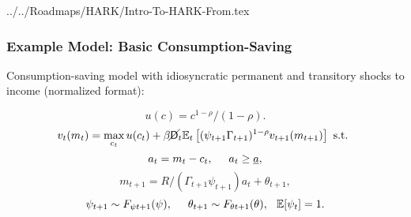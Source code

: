 \documentclass[11ptt]{beamer}
\newcommand{\E}{\mathbb{E}}
\newcommand{\ei}{\end{itemize}}
\newcommand{\Die}{\mathsf{D}}
\newcommand{\Live}{\cancel{\Die}}
\begin{document}
\begin{verbatimwrite}{../../Roadmaps/HARK/Intro-To-HARK-From.tex}


\end{verbatimwrite}


\begin{frame}\label{ModelMath}
\frametitle{Example Model: Basic Consumption-Saving}

Consumption-saving model with idiosyncratic permanent and transitory shocks to income (normalized format):

\begin{equation*}
u(c) = c^{1-\rho}/(1-\rho).
\end{equation*}
\begin{equation*}
v_t(m_t) = \max_{c_t} u(c_t) + \beta \Live_t \E_t \left[(\psi_{t+1} \Gamma_{t+1})^{1-\rho} v_{t+1}(m_{t+1}) \right] \text{ s.t. }
\end{equation*}
\begin{equation*}
a_t = m_t - c_t, \hspace{0.5cm} a_t \geq \underline{a},
\end{equation*}
\begin{equation*}
m_{t+1} = R/(\Gamma_{t+1} \psi_{t+1}) a_t + \theta_{t+1}, 
\end{equation*}
\begin{equation*}
\psi_{t+1} \sim F_{\psi t+1}(\psi), \hspace{0.5cm} \theta_{t+1} \sim F_{\theta t+1}(\theta), \hspace{0.25cm} \E[\psi_t] = 1.
\end{equation*}
\end{frame}
\end{document}

